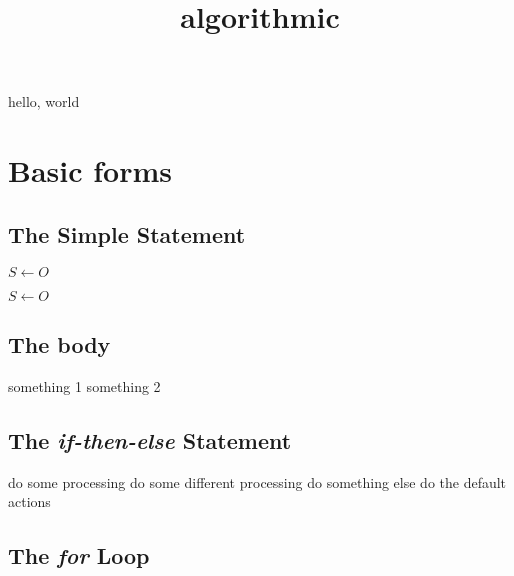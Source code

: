 \documentclass{amsart}
\title{algorithmic}
\begin{document}
\maketitle

hello, world


\section{Basic forms}

\subsection{The Simple Statement}

\begin{algorithmic}[1]
\STATE $S \leftarrow O$
\end{algorithmic}

\begin{algorithmic}[1]
\STATE $S \leftarrow O$ 
\end{algorithmic}

\subsection{The body}

\begin{algorithmic}[1]
\BODY[comment]
    \STATE something 1
    \STATE something 2
\ENDBODY
\end{algorithmic}

\subsection{The \emph{if-then-else} Statement}


\begin{algorithmic}[3]
    \STATE do some processing
    \STATE do some different processing
    \STATE do something else
\ELSE[comment]
    \STATE do the default actions
\ENDIF
\end{algorithmic}

\subsection{The \emph{for} Loop}
\end{document}
